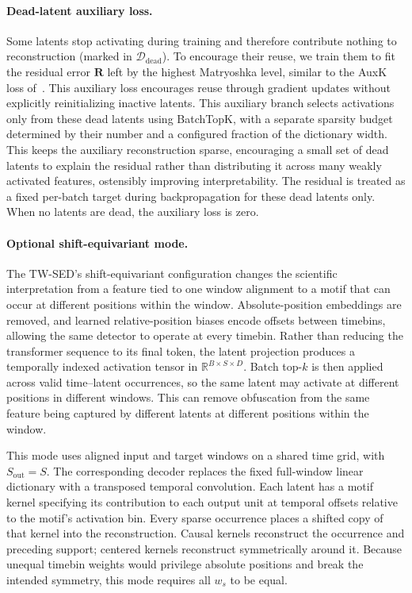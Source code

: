 \paragraph{Dead-latent auxiliary loss.}
Some latents stop activating during training and therefore contribute nothing to reconstruction (marked in $\mathcal{D}_{\mathrm{dead}}$). To encourage their reuse, we  train them to fit the residual error $\mathbf{R}$ left by the highest Matryoshka level, similar to the AuxK loss of~\citet{gao_2025_topk_saes}. This auxiliary loss encourages reuse through gradient updates without explicitly reinitializing inactive latents. This auxiliary branch selects activations only from these dead latents using BatchTopK, with a separate sparsity budget determined by their number and a configured fraction of the dictionary width. This keeps the auxiliary reconstruction sparse, encouraging a small set of dead latents to explain the residual rather than distributing it across many weakly activated features, ostensibly improving interpretability. The residual is treated as a fixed per-batch target during backpropagation for these dead latents only. When no latents are dead, the auxiliary loss is zero.

\paragraph{Optional shift-equivariant mode.}
The TW-SED's shift-equivariant configuration changes the scientific interpretation from a feature tied to one window alignment to a motif that can occur at different positions within the window. Absolute-position embeddings are removed, and learned relative-position biases encode offsets between timebins, allowing the same detector to operate at every timebin. Rather than reducing the transformer sequence to its final token, the latent projection produces a temporally indexed activation tensor in $\mathbb{R}^{B\times S\times D}$. Batch top-$k$ is then applied across valid time--latent occurrences, so the same latent may activate at different positions in different windows. This can remove obfuscation from the same feature being captured by different latents at different positions within the window.

This mode uses aligned input and target windows on a shared time grid, with $S_{\mathrm{out}}=S$. The corresponding decoder replaces the fixed full-window linear dictionary with a transposed temporal convolution. Each latent has a motif kernel specifying its contribution to each output unit at temporal offsets relative to the motif's activation bin. Every sparse occurrence places a shifted copy of that kernel into the reconstruction. Causal kernels reconstruct the occurrence and preceding support; centered kernels reconstruct symmetrically around it. Because unequal timebin weights would privilege absolute positions and break the intended symmetry, this mode requires all $w_s$ to be equal.

